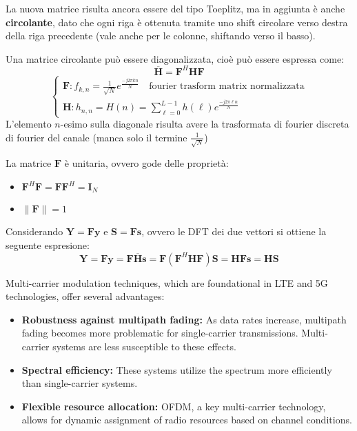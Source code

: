 La nuova matrice risulta ancora essere del tipo Toeplitz, ma in aggiunta è anche \textbf{circolante}, dato che ogni riga è ottenuta tramite uno shift circolare verso destra della riga precedente (vale anche per le colonne, shiftando verso il basso).

Una matrice circolante può essere diagonalizzata, cioè può essere espressa come:
\[
    \overline{\mathbf{H}} = \mathbf{F}^H \mathbf{H} \mathbf{F}
\]
\[
    \begin{cases*}
        \mathbf{F}: f_{k, n} = \frac{1}{\sqrt{N}} e^{\frac{-j2\pi kn}{N}} \quad \text{fourier trasform matrix normalizzata} \\
        \mathbf{H}: h_{n, n} = H(n) = \sum_{\ell=0}^{L-1} h(\ell) e^{\frac{-j2\pi \ell n}{N}} 
    \end{cases*}
\]
L'elemento $n$-esimo sulla diagonale risulta avere la trasformata di fourier discreta di fourier del canale (manca solo il termine $\frac{1}{\sqrt{N}}$)


La matrice $\mathbf{F}$ è unitaria, ovvero gode delle proprietà:
\begin{itemize}
    \item $\mathbf{F}^H \mathbf{F} = \mathbf{F} \mathbf{F}^H = \mathbf{I}_N$
    \item $\| \mathbf{F} \| = 1$ 
\end{itemize}

Considerando $\mathbf{Y} = \mathbf{F} \mathbf{y}$ e $\mathbf{S} = \mathbf{F} \mathbf{s}$, ovvero le DFT dei due vettori si ottiene la seguente espresione:
\[
    \mathbf{Y} = \mathbf{F} \mathbf{y} = \mathbf{F} \mathbf{\overline{H}} \mathbf{s} = \mathbf{F} \left(\mathbf{F}^H \mathbf{H} \mathbf{F}\right)\mathbf{S} =  \mathbf{H} \mathbf{F} \mathbf{s} = \mathbf{H} \mathbf{S}
\]

Multi-carrier modulation techniques, which are foundational in LTE and 5G technologies, offer several advantages:

\begin{itemize}
    \item \textbf{Robustness against multipath fading:} As data rates increase, multipath fading becomes more problematic for single-carrier transmissions. Multi-carrier systems are less susceptible to these effects.
    \item \textbf{Spectral efficiency:} These systems utilize the spectrum more efficiently than single-carrier systems.
    \item \textbf{Flexible resource allocation:} OFDM, a key multi-carrier technology, allows for dynamic assignment of radio resources based on channel conditions.
\end{itemize}

